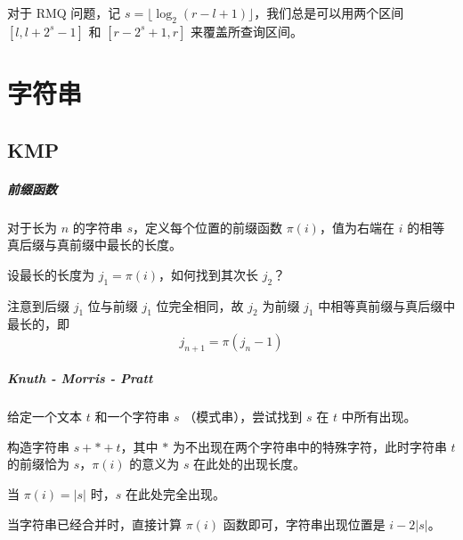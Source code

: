 \documentclass{probook}
\begin{document}
\begin{multicols}{2}


对于 RMQ 问题，记 $s = \lfloor\log_2(r-l+1)\rfloor$，我们总是可以用两个区间 $[l,l+2^s-1]$ 和 $[r-2^s+1,r]$ 来覆盖所查询区间。









\chapter{字符串}

\section{KMP}

\paragraph{前缀函数}

对于长为 $n$ 的字符串 $s$，定义每个位置的前缀函数 $\pi(i)$，值为右端在 $i$ 的相等真后缀与真前缀中最长的长度。

设最长的长度为 $j_1=\pi(i)$，如何找到其次长 $j_2$？

注意到后缀 $j_1$ 位与前缀 $j_1$ 位完全相同，故 $j_2$ 为前缀 $j_1$ 中相等真前缀与真后缀中最长的，即
\[j_{n+1} = \pi(j_n-1)\]



\paragraph{Knuth - Morris - Pratt}

给定一个文本 $t$ 和一个字符串 $s$ （模式串），尝试找到 $s$ 在 $t$ 中所有出现。

构造字符串 $s+*+t$，其中 $*$ 为不出现在两个字符串中的特殊字符，此时字符串 $t$ 的前缀恰为 $s$，$\pi(i)$ 的意义为 $s$ 在此处的出现长度。

当 $\pi(i)=|s|$ 时，$s$ 在此处完全出现。

当字符串已经合并时，直接计算 $\pi(i)$ 函数即可，字符串出现位置是 $i-2|s|$。







\end{multicols}
\end{document}
